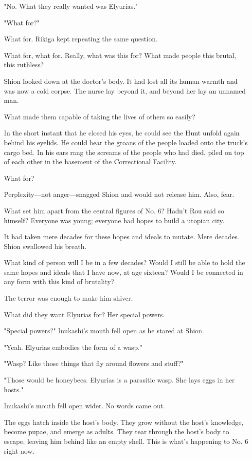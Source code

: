 "No. What they really wanted was Elyurias."

"What for?"

What for. Rikiga kept repeating the same question.

What for, what for. Really, what was this for? What made people this
brutal, this ruthless?

Shion looked down at the doctor's body. It had lost all its human warmth
and was now a cold corpse. The nurse lay beyond it, and beyond her lay
an unnamed man.

What made them capable of taking the lives of others so easily?

In the short instant that he closed his eyes, he could see the Hunt
unfold again behind his eyelids. He could hear the groans of the people
loaded onto the truck's cargo bed. In his ears rang the screams of the
people who had died, piled on top of each other in the basement of the
Correctional Facility.

What for?

Perplexity―not anger―snagged Shion and would not release him. Also,
fear.

What set him apart from the central figures of No. 6? Hadn't Rou said so
himself? Everyone was young; everyone had hopes to build a utopian city.

It had taken mere decades for these hopes and ideals to mutate. Mere
decades. Shion swallowed his breath.

What kind of person will I be in a few decades? Would I still be able to
hold the same hopes and ideals that I have now, at age sixteen? Would I
be connected in any form with this kind of brutality?

The terror was enough to make him shiver.

What did they want Elyurias for? Her special powers.

"Special powers?" Inukashi's mouth fell open as he stared at Shion.

"Yeah. Elyurias embodies the form of a wasp."

"Wasp? Like those things that fly around flowers and stuff?"

"Those would be honeybees. Elyurias is a parasitic wasp. She lays eggs
in her hosts."

Inukashi's mouth fell open wider. No words came out.

The eggs hatch inside the host's body. They grow without the host's
knowledge, become pupae, and emerge as adults. They tear through the
host's body to escape, leaving him behind like an empty shell. This is
what's happening to No. 6 right now.

